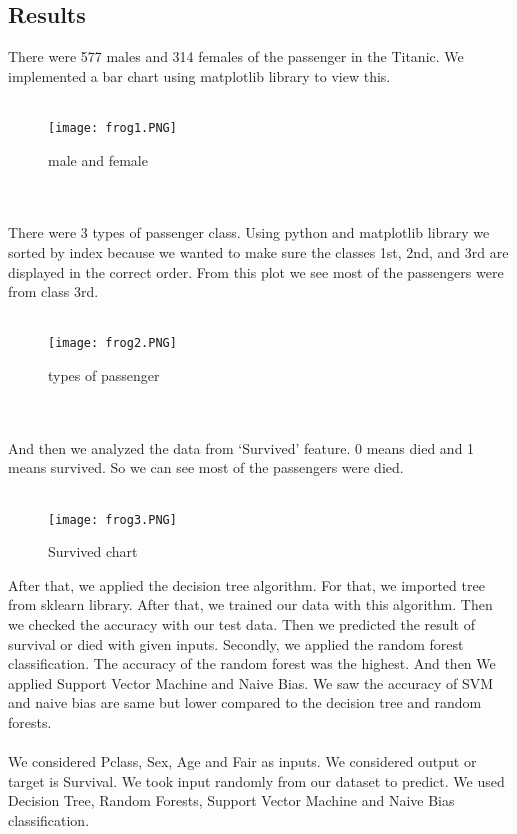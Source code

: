 \documentclass[11pt]{article} %
\begin{document}
\subsection{Results}
There were 577 males and 314 females of the passenger in the Titanic.  We implemented a bar chart using matplotlib library to view this.
\\  \\
\begin{figure}[t]
\centering %
\texttt{[image: frog1.PNG]} %
\caption{male and female}
\label{fig:frog}
\end{figure}
\\  \\
There were 3 types of passenger class. Using python and matplotlib library we sorted by index because we wanted to make sure the classes 1st, 2nd, and 3rd are displayed in the correct order. From this plot we see most of the passengers were from class 3rd.
\\  \\
\begin{figure}[t]
\centering %
\texttt{[image: frog2.PNG]} %
\caption{types of passenger }
\label{fig:frog}
\end{figure}
\\  \\
And then we analyzed the data from ‘Survived’ feature. 0 means died and 1 means survived. So we can see most of the passengers were died.
\\ \\

\begin{figure}[t]
\centering %
\texttt{[image: frog3.PNG]} %
\caption{Survived chart}
\label{fig:frog}
\end{figure}


After that, we applied the decision tree algorithm.  For that, we imported tree from sklearn library.  After that, we trained our data with this algorithm. Then we checked the accuracy with our test data. Then we predicted the result of survival or died with given inputs. 
Secondly, we applied the random forest classification. The accuracy of the random forest was the highest. 
And then We applied Support Vector Machine and Naive Bias. We saw the accuracy of SVM and naive bias are same but lower compared to the decision tree and random forests.
\\ \\
We considered Pclass, Sex, Age and Fair as inputs. We considered output or target is Survival. We took input randomly from our dataset to predict. We used Decision Tree, Random Forests, Support Vector Machine and Naive Bias classification. 
\\  \\
\end{document}
